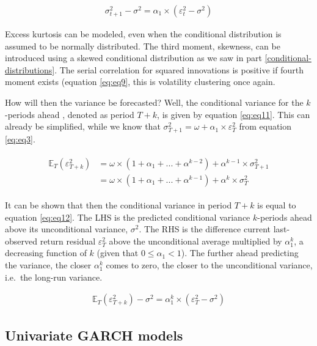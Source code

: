 \documentclass[a4paper, twoside]{templates/ociamthesis}
\begin{document}
\begin{align} 
\sigma_{t+1}^2 - \sigma^2 = \alpha_1\times(\varepsilon_t^2 - \sigma^2)
 \label{eq:eq10}
\end{align}

\noindent Excess kurtosis can be modeled, even when the conditional distribution is assumed to be normally distributed. The third moment, skewness, can be introduced using a skewed conditional distribution as we saw in part \ref{conditional-distributions}. The serial correlation for squared innovations is positive if fourth moment exists (equation \eqref{eq:eq9}, this is volatility clustering once again.

\noindent How will then the variance be forecasted? Well, the conditional variance for the \(k\)-periods ahead , denoted as period \(T+k\), is given by equation \eqref{eq:eq11}. This can already be simplified, while we know that \(\sigma_{T+1}^2 = \omega + \alpha_1 \times \varepsilon_T^2\) from equation \eqref{eq:eq3}.

\begin{align} 
\begin{split}
\mathbb{E}_T(\varepsilon_{T+k}^2) 
&= \omega\times(1+\alpha_1 + ... + \alpha^{k-2}) + \alpha^{k-1}\times\sigma_{T+1}^2 \\
&= \omega\times(1+\alpha_1 + ... + \alpha^{k-1}) + \alpha^{k}\times\sigma_{T}^2
\end{split}
 \label{eq:eq11}
\end{align}

\noindent It can be shown that then the conditional variance in period \(T+k\) is equal to equation \eqref{eq:eq12}. The LHS is the predicted conditional variance \(k\)-periods ahead above its unconditional variance, \(\sigma^2\). The RHS is the difference current last-observed return residual \(\varepsilon_T^2\) above the unconditional average multiplied by \(\alpha_1^k\), a decreasing function of \(k\) (given that \(0 \le\alpha_1 <1\)). The further ahead predicting the variance, the closer \(\alpha_1^k\) comes to zero, the closer to the unconditional variance, i.e.~the long-run variance.

\begin{align} 
\mathbb{E}_T(\varepsilon_{T+k}^2) - \sigma^2 = \alpha_1^k\times(\varepsilon_T^2 - \sigma^2)
 \label{eq:eq12}
\end{align}

\hypertarget{univ-garch}{%
\subsection{Univariate GARCH models}\label{univ-garch}}
\end{document}
